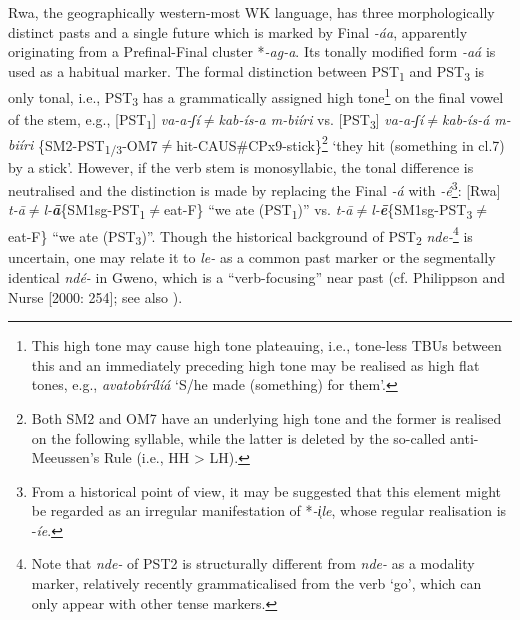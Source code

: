 \documentclass[output=paper]{langscibook}
\begin{document}
Rwa, the geographically western-most WK language, has three morphologically distinct pasts and a single future which is marked by Final \textit{{}-áa}, apparently originating from a Prefinal-Final cluster *\textit{{}-ag-a}. Its tonally modified form \textit{{}-aá} is used as a habitual marker. The formal distinction between PST\textsubscript{1} and PST\textsubscript{3} is only tonal, i.e., PST\textsubscript{3} has a grammatically assigned high tone\footnote{This high tone may cause high tone plateauing, i.e., tone-less TBUs between this and an immediately preceding high tone may be realised as high flat tones, e.g., \textit{avatobírílíá} ‘S/he made (something) for them’.} on the final vowel of the stem, e.g., [PST\textsubscript{1}] \textit{va-a-ʃí${\neq}$kab-ís-a m-biíri} vs. [PST\textsubscript{3}] \textit{va{}-a{}-ʃí${\neq}$kab-ís-á m-biíri} \{SM2-PST\textsubscript{1/3}{}-OM7${\neq}$hit-CAUS\#CPx9-stick\}\footnote{Both SM2 and OM7 have an underlying high tone and the former is realised on the following syllable, while the latter is deleted by the so-called anti-Meeussen’s Rule (i.e., HH > LH).} ‘they hit (something in cl.7) by a stick’. However, if the verb stem is monosyllabic, the tonal difference is neutralised and the distinction is made by replacing the Final \textit{{}-á} with \textit{{}-é}\footnote{From a historical point of view, it may be suggested that this element might be regarded as an irregular manifestation of *\textit{{}-i̜le}, whose regular realisation is -\textit{íe}.}: [Rwa] \textit{t-ā${\neq}$l-}\textbf{\textit{ā}}\{SM1sg-PST\textsubscript{1}${\neq}$eat-F\} “we ate (PST\textsubscript{1})” vs. \textit{t-ā${\neq}$l-}\textbf{\textit{ē}}\{SM1sg-PST\textsubscript{3}${\neq}$eat-F\} “we ate (PST\textsubscript{3})”. Though the historical background of PST\textsubscript{2} \textit{nde-}\footnote{Note that \textit{nde-} of PST2 is structurally different from \textit{nde-} as a modality marker, relatively recently grammaticalised from the verb ‘go’, which can only appear with other tense markers.} is uncertain, one may relate it to \textit{le-} as a common past marker or the segmentally identical \textit{ndé-} in Gweno, which is a “verb-focusing” near past (cf. Philippson and Nurse [2000: 254]; see also ).
\end{document}
